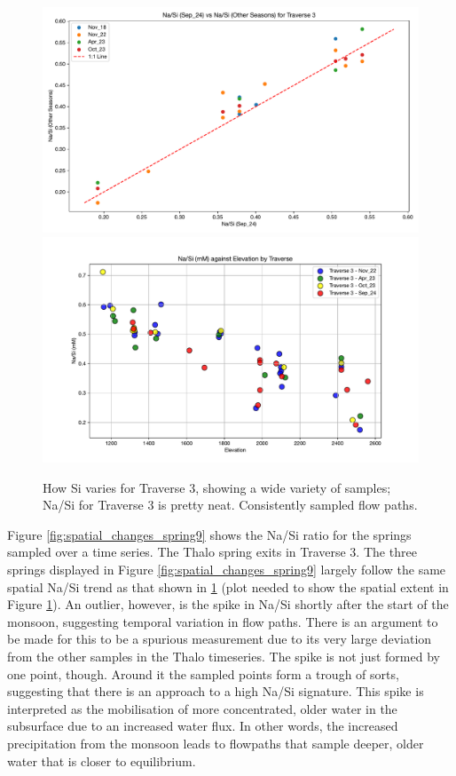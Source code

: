 \begin{figure}[h]
    \centering
    \includegraphics[width=\textwidth]{Na_Si_Trav3.pdf}
    \includegraphics[width=\textwidth]{Na_Si_Elevation.pdf}
    \caption{How Si varies for Traverse 3, showing a wide variety of samples; Na/Si for Traverse 3 is pretty neat. Consistently sampled flow paths.}
    \label{fig:spatial_changes_spring8}
\end{figure}
\FloatBarrier

Figure \ref{fig:spatial_changes_spring9} shows the Na/Si ratio for the springs sampled over a time series. The Thalo spring exits in Traverse 3. The three springs displayed in Figure  \ref{fig:spatial_changes_spring9} largely follow the same spatial Na/Si trend as that shown in \ref{fig:spatial_changes_spring8} (plot needed to show the spatial extent in Figure \ref{fig:spatial_changes_spring8}). An outlier, however, is the spike in Na/Si shortly after the start of the monsoon, suggesting temporal variation in flow paths. There is an argument to be made for this to be a spurious measurement due to its very large deviation from the other samples in the Thalo timeseries. The spike is not just formed by one point, though. Around it the sampled points form a trough of sorts, suggesting that there is an approach to a high Na/Si signature. This spike is interpreted as the mobilisation of more concentrated, older water in the subsurface due to an increased water flux. In other words, the increased precipitation from the monsoon leads to flowpaths that sample deeper, older water that is closer to equilibrium.

